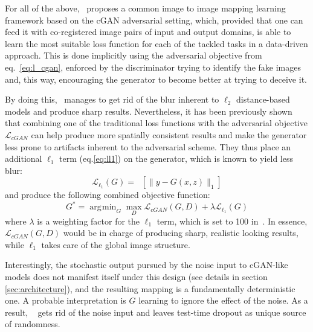 \documentclass[10pt,twocolumn,letterpaper]{article}
\DeclareMathOperator*{\argmin}{\arg\!\min}
\begin{document}
For all of the above,~\cite{Isola_2017_CVPR} proposes a common image to image mapping learning framework based on the cGAN adversarial setting, which, provided that one can feed it with co-registered image pairs of input and output domains, is able to learn the most suitable loss function for each of the tackled tasks in a data-driven approach. This is done implicitly using the adversarial objective from eq.~\ref{eq:l_cgan}, enforced by the discriminator trying to identify the fake images and, this way, encouraging the generator to become better at trying to deceive it. 

By doing this,~\cite{Isola_2017_CVPR} manages to get rid of the blur inherent to $\ell_2$ distance-based models and produce sharp results.
Nevertheless, it has been previously shown~\cite{Pathak_2016_CVPR, Shrivastava_2017_CVPR} that combining one of the traditional loss functions with the adversarial objective $\mathcal{L}_{cGAN}$ can help produce more spatially consistent results and make the generator less prone to artifacts inherent to the adversarial scheme.
They thus place an additional $\ell_1$ term (eq.\ref{eq:ll1}) on the generator, which is known to yield less blur:
\begin{equation} \label{eq:ll1}
\mathcal{L}_{\ell_1}(G) = \mathop{\mathbb{E}_{x,y\sim p_{data}(x,y),z\sim p_{noise}(z)}} [\|y-G(x,z)\|_1]
\end{equation}
and produce the following combined objective function:
\begin{equation} \label{eq:minmax_lgan_lone}
G^* = \argmin_{G} \max_{D} \mathcal{L}_{cGAN}(G,D) + \lambda\mathcal{L}_{\ell_1}(G)
\end{equation}
where $\lambda$ is a weighting factor for the $\ell_1$ term, which is set to 100 in~\cite{Isola_2017_CVPR}. 
In essence, $\mathcal{L}_{cGAN}(G,D)$ would be in charge of producing sharp, realistic looking results, while $\ell_1$ takes care of the global image structure.

Interestingly, the stochastic output pursued by the noise input to cGAN-like models does not manifest itself under this design (see details in section \ref{sec:architecture}), and the resulting mapping is a fundamentally deterministic one.
A probable interpretation is $G$ learning to ignore the effect of the noise. 
As a result, ~\cite{Isola_2017_CVPR} gets rid of the noise input and leaves test-time dropout as unique source of randomness.
\end{document}
